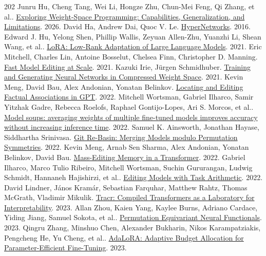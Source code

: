 \begin{thebibliography}{202}\footnotesize
{} Junru Hu, Cheng Tang, Wei Li, Hongze Zhu, Chun-Mei Feng, Qi Zhang, et al.. \href{https://arxiv.org/abs/2611.09382v1}{Exploring Weight-Space Programming: Capabilities, Generalization, and Limitations}. 2026.
 David Ha, Andrew Dai, Quoc V. Le. \href{https://arxiv.org/abs/1609.09106}{HyperNetworks}. 2016.
 Edward J. Hu, Yelong Shen, Phillip Wallis, Zeyuan Allen-Zhu, Yuanzhi Li, Shean Wang, et al.. \href{https://arxiv.org/abs/2106.09685}{LoRA: Low-Rank Adaptation of Large Language Models}. 2021.
 Eric Mitchell, Charles Lin, Antoine Bosselut, Chelsea Finn, Christopher D. Manning. \href{https://arxiv.org/abs/2110.11309}{Fast Model Editing at Scale}. 2021.
 Kazuki Irie, Jürgen Schmidhuber. \href{https://arxiv.org/abs/2112.15545v1}{Training and Generating Neural Networks in Compressed Weight Space}. 2021.
 Kevin Meng, David Bau, Alex Andonian, Yonatan Belinkov. \href{https://arxiv.org/abs/2202.05262}{Locating and Editing Factual Associations in GPT}. 2022.
 Mitchell Wortsman, Gabriel Ilharco, Samir Yitzhak Gadre, Rebecca Roelofs, Raphael Gontijo-Lopes, Ari S. Morcos, et al.. \href{https://arxiv.org/abs/2203.05482v3}{Model soups: averaging weights of multiple fine-tuned models improves accuracy without increasing inference time}. 2022.
 Samuel K. Ainsworth, Jonathan Hayase, Siddhartha Srinivasa. \href{https://arxiv.org/abs/2209.04836}{Git Re-Basin: Merging Models modulo Permutation Symmetries}. 2022.
 Kevin Meng, Arnab Sen Sharma, Alex Andonian, Yonatan Belinkov, David Bau. \href{https://arxiv.org/abs/2210.07229}{Mass-Editing Memory in a Transformer}. 2022.
 Gabriel Ilharco, Marco Tulio Ribeiro, Mitchell Wortsman, Suchin Gururangan, Ludwig Schmidt, Hannaneh Hajishirzi, et al.. \href{https://arxiv.org/abs/2212.04089}{Editing Models with Task Arithmetic}. 2022.
 David Lindner, János Kramár, Sebastian Farquhar, Matthew Rahtz, Thomas McGrath, Vladimir Mikulik. \href{https://arxiv.org/abs/2301.05062}{Tracr: Compiled Transformers as a Laboratory for Interpretability}. 2023.
 Allan Zhou, Kaien Yang, Kaylee Burns, Adriano Cardace, Yiding Jiang, Samuel Sokota, et al.. \href{https://arxiv.org/abs/2302.14040v3}{Permutation Equivariant Neural Functionals}. 2023.
 Qingru Zhang, Minshuo Chen, Alexander Bukharin, Nikos Karampatziakis, Pengcheng He, Yu Cheng, et al.. \href{https://arxiv.org/abs/2303.10512v2}{AdaLoRA: Adaptive Budget Allocation for Parameter-Efficient Fine-Tuning}. 2023.

\end{thebibliography}
